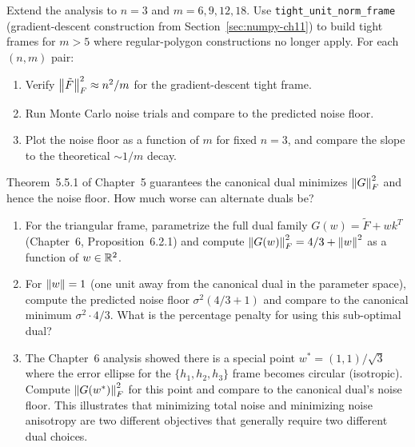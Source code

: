 \begin{exercisebox}[title={Lab Exercise 11.4: Higher Dimensions}]
Extend the analysis to $n=3$ and $m=6,9,12,18$. Use
\texttt{tight\_unit\_norm\_frame} (gradient-descent construction from
Section~\ref{sec:numpy-ch11}) to build tight frames for $m>5$ where
regular-polygon constructions no longer apply. For each $(n,m)$ pair:
\begin{enumerate}[label=(\alph*)]
  \item Verify $\left\| \tilde F \right\|_F^2 \approx n^2/m$ for the gradient-descent
        tight frame.
  \item Run Monte Carlo noise trials and compare to the predicted noise
        floor.
  \item Plot the noise floor as a function of $m$ for fixed $n=3$, and
        compare the slope to the theoretical $\sim 1/m$ decay.
\end{enumerate}
\end{exercisebox}

\begin{exercisebox}[title={Lab Exercise 11.5 (Challenge): Alternate Duals and Noise}]
Theorem~5.5.1 of Chapter~5 guarantees the canonical dual minimizes
$\left\| G \right\|_F^2$ and hence the noise floor. How much worse can alternate
duals be?
\begin{enumerate}[label=(\alph*)]
  \item For the triangular frame, parametrize the full dual family
        $G(w) = \tilde F + wk^T$ (Chapter~6, Proposition~6.2.1) and
        compute $\left\| G(w) \right\|_F^2 = 4/3 + \left\| w \right\|^2$ as a function of
        $w\in\mathbb{R}^2$.
  \item For $\left\| w \right\|=1$ (one unit away from the canonical dual in the
        parameter space), compute the predicted noise floor
        $\sigma^2(4/3+1)$ and compare to the canonical minimum
        $\sigma^2\cdot 4/3$. What is the percentage penalty for using
        this sub-optimal dual?
  \item The Chapter~6 analysis showed there is a special point
        $w^*=(1,1)/\sqrt3$ where the error ellipse for the $\{h_1,h_2,h_3\}$
        frame becomes circular (isotropic). Compute $\left\| G(w^*) \right\|_F^2$
        for this point and compare to the canonical dual's noise floor.
        This illustrates that minimizing total noise and minimizing noise
        anisotropy are two different objectives that generally require
        two different dual choices.
\end{enumerate}
\end{exercisebox}
\newpage
